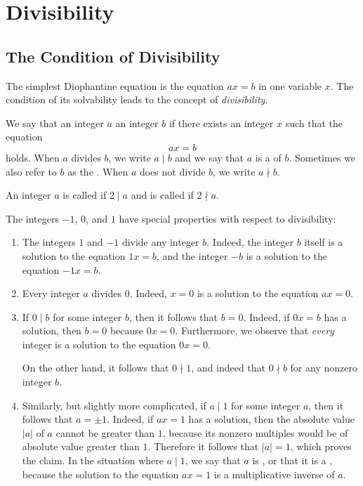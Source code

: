 \chapter{Divisibility}
\label{chapter:divisibility}

\section{The Condition of Divisibility}

The simplest Diophantine equation is the equation $ax=b$ in one variable $x$. The condition of its solvability leads to the concept of \emph{divisibility}.

\begin{definition}
  We say that an integer $a$  an integer $b$ if there exists an integer $x$ such that the equation
  \begin{equation*}
    ax=b
  \end{equation*}
  holds. When $a$ divides $b$, we write $a\mid b$ and we say that $a$ is a  of $b$. Sometimes we also refer to $b$ as the . When $a$ does not divide $b$, we write $a\nmid b$.

  An integer $a$ is called  if $2\mid a$ and is called  if $2\nmid a$.
\end{definition}

\begin{example}
  The integers $-1$, $0$, and $1$ have special properties with respect to divisibility:
  \begin{enumerate}
  \item The integers $1$ and $-1$ divide any integer $b$. Indeed, the integer $b$ itself is a solution to the equation $1x=b$, and the integer $-b$ is a solution to the equation $-1x=b$.
  \item Every integer $a$ divides $0$. Indeed, $x=0$ is a solution to the equation $ax=0$.
  \item If $0\mid b$ for some integer $b$, then it follows that $b=0$. Indeed, if $0x=b$ has a solution, then $b=0$ because $0x=0$. Furthermore, we observe that \emph{every} integer is a solution to the equation $0x=0$.
    
    On the other hand, it follows that $0\nmid 1$, and indeed that $0\nmid b$ for any nonzero integer $b$.
  \item Similarly, but slightly more complicated, if $a\mid 1$ for some integer $a$, then it follows that $a=\pm 1$. Indeed, if $ax=1$ has a solution, then the absolute value $|a|$ of $a$ cannot be greater than $1$, because its nonzero multiples would be of absolute value greater than $1$. Therefore it follows that $|a|=1$, which proves the claim. In the situation where $a\mid 1$, we say that $a$ is , or that it is a , because the solution to the equation $ax=1$ is a multiplicative inverse of $a$.
  \end{enumerate}
\end{example}

